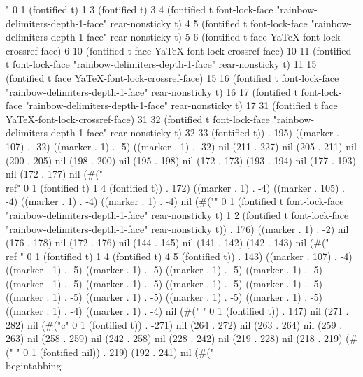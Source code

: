 {" 0 1 (fontified t) 1 3 (fontified t) 3 4 (fontified t font-lock-face "rainbow-delimiters-depth-1-face" rear-nonsticky t) 4 5 (fontified t font-lock-face "rainbow-delimiters-depth-1-face" rear-nonsticky t) 5 6 (fontified t face YaTeX-font-lock-crossref-face) 6 10 (fontified t face YaTeX-font-lock-crossref-face) 10 11 (fontified t font-lock-face "rainbow-delimiters-depth-1-face" rear-nonsticky t) 11 15 (fontified t face YaTeX-font-lock-crossref-face) 15 16 (fontified t font-lock-face "rainbow-delimiters-depth-1-face" rear-nonsticky t) 16 17 (fontified t font-lock-face "rainbow-delimiters-depth-1-face" rear-nonsticky t) 17 31 (fontified t face YaTeX-font-lock-crossref-face) 31 32 (fontified t font-lock-face "rainbow-delimiters-depth-1-face" rear-nonsticky t) 32 33 (fontified t)) . 195) ((marker . 107) . -32) ((marker . 1) . -5) ((marker . 1) . -32) nil (211 . 227) nil (205 . 211) nil (200 . 205) nil (198 . 200) nil (195 . 198) nil (172 . 173) (193 . 194) nil (177 . 193) nil (172 . 177) nil (#("\\ref" 0 1 (fontified t) 1 4 (fontified t)) . 172) ((marker . 1) . -4) ((marker . 105) . -4) ((marker . 1) . -4) ((marker . 1) . -4) nil (#("{}" 0 1 (fontified t font-lock-face "rainbow-delimiters-depth-1-face" rear-nonsticky t) 1 2 (fontified t font-lock-face "rainbow-delimiters-depth-1-face" rear-nonsticky t)) . 176) ((marker . 1) . -2) nil (176 . 178) nil (172 . 176) nil (144 . 145) nil (141 . 142) (142 . 143) nil (#("\\ref
" 0 1 (fontified t) 1 4 (fontified t) 4 5 (fontified t)) . 143) ((marker . 107) . -4) ((marker . 1) . -5) ((marker . 1) . -5) ((marker . 1) . -5) ((marker . 1) . -5) ((marker . 1) . -5) ((marker . 1) . -5) ((marker . 1) . -5) ((marker . 1) . -5) ((marker . 1) . -5) ((marker . 1) . -5) ((marker . 1) . -5) ((marker . 1) . -5) ((marker . 1) . -4) ((marker . 1) . -4) nil (#("
" 0 1 (fontified t)) . 147) nil (271 . 282) nil (#("c" 0 1 (fontified t)) . -271) nil (264 . 272) nil (263 . 264) nil (259 . 263) nil (258 . 259) nil (242 . 258) nil (228 . 242) nil (219 . 228) nil (218 . 219) (#(" " 0 1 (fontified nil)) . 219) (192 . 241) nil (#("\\begin{tabbing}
}
